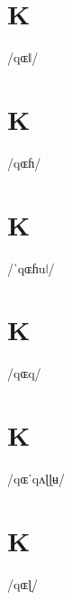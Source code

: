 \documentclass[10pt,a4paper,twoside]{book}
\begin{document}
\section*{K}

\begin{multicols}{3}
 {/qɶǁ/} {}
\end{multicols}

\section*{K}

\begin{multicols}{3}
 {/qɶɦ/} {}
\end{multicols}

\section*{K}

\begin{multicols}{3}
 {/ˈqɶɦuǀ/} {}
\end{multicols}

\section*{K}

\begin{multicols}{3}
 {/qɶq/} {}
\end{multicols}

\section*{K}

\begin{multicols}{3}
 {/qɶˈqʌɭɭʉ/} {}
\end{multicols}

\section*{K}

\begin{multicols}{3}
 {/qɶɭ/} {}
\end{multicols}
\end{document}
